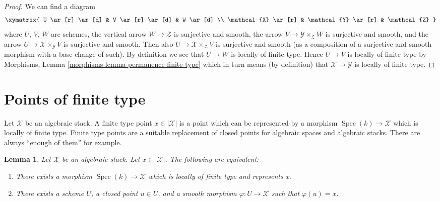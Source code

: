\documentclass{stacks-project}
\theoremstyle{plain}
\newtheorem{lemma}[subsection]{Lemma}
\theoremstyle{definition}
\theoremstyle{remark}
\numberwithin{equation}{subsection}
\def\Spec{\mathop{\mathrm{Spec}}}
\begin{document}
\begin{proof}
We can find a diagram
$$
\xymatrix{
U \ar[r] \ar[d] & V \ar[r] \ar[d] & W \ar[d] \\
\mathcal{X} \ar[r] & \mathcal{Y} \ar[r] & \mathcal{Z}
}
$$
where $U$, $V$, $W$ are schemes, the vertical arrow $W \to \mathcal{Z}$
is surjective and smooth, the arrow $V \to \mathcal{Y} \times_\mathcal{Z} W$
is surjective and smooth, and the arrow
$U \to \mathcal{X} \times_\mathcal{Y} V$ is surjective and smooth.
Then also $U \to \mathcal{X} \times_\mathcal{Z} V$ is surjective and
smooth (as a composition of a surjective and smooth morphism with a
base change of such). By definition we see that $U \to W$ is locally
of finite type. Hence $U \to V$ is locally of finite type by
Morphisms, Lemma \ref{morphisms-lemma-permanence-finite-type}
which in turn means (by definition) that $\mathcal{X} \to \mathcal{Y}$
is locally of finite type.
\end{proof}










\section{Points of finite type}
\label{section-points-finite-type}

\noindent
Let $\mathcal{X}$ be an algebraic stack.
A finite type point $x \in |\mathcal{X}|$ is a point which can be represented
by a morphism $\Spec(k) \to \mathcal{X}$ which is locally of finite type.
Finite type points are a suitable replacement of closed points for algebraic
spaces and algebraic stacks. There are always ``enough of them'' for example.

\begin{lemma}
\label{lemma-point-finite-type}
Let $\mathcal{X}$ be an algebraic stack.
Let $x \in |\mathcal{X}|$. The following are equivalent:
\begin{enumerate}
\item There exists a morphism $\Spec(k) \to \mathcal{X}$
which is locally of finite type and represents $x$.
\item There exists a scheme $U$, a closed point $u \in U$, and a smooth
morphism $\varphi : U \to \mathcal{X}$ such that $\varphi(u) = x$.
\end{enumerate}
\end{lemma}
\end{document}
